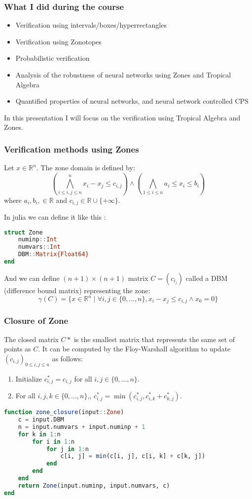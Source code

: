 \documentclass{beamer}
\begin{document}
\begin{frame}
    \frametitle{What I did during the course}
    \begin{itemize}
        \item Verification using intervals/boxes/hyperrectangles
        \item Verification using Zonotopes
        \item Probabilistic verification
        \item Analysis of the robustness of neural networks using Zones and Tropical Algebra
        \item  Quantified properties of neural networks,
        and neural network controlled CPS
    \end{itemize}

In this presentation I will focus on the verification using Tropical Algebra and Zones.
\end{frame}
\begin{frame}[fragile]
\frametitle{Verification methods using Zones}

        Let \(x \in \mathbb{R}^n \). The zone domain is defined by:
        \[(\bigwedge_{i\leq i,j\leq n}^n x_i - x_j \leq c_{i,j}) \land (\bigwedge_{1\leq i\leq n} a_i \leq x_i \leq b_i)\]
        where \(a_i, b_i,  \in \mathbb{R} \) and \(c_{i,j} \in \mathbb{R} \cup \{+\infty\} \).

    In julia we can define it like this : 
\begin{lstlisting}[language= Julia]
struct Zone
    numinp::Int 
    numvars::Int
    DBM::Matrix{Float64}
end
\end{lstlisting}
And we can define \((n+1) \times (n+1) \) matrix \(C = (c_{i_j})\) called a DBM (difference bound matrix) representing the zone:
\[ \gamma(C) = \{x \in \mathbb{R}^n \mid \forall i,j \in \{0, \ldots, n\}, x_i - x_j \leq c_{i,j} \land x_0 = 0 \} \]
\end{frame}

\begin{frame}[fragile]
\frametitle{Closure of Zone}

The closed matrix \(C* \) is the smallest matrix that represents the same set of points as \(C \). It can be computed by the Floy-Warshall algorithm to update \((c_{i,j})_{0\leq i,j\leq n} \) as follows:
\begin{enumerate}
    \item Initialize \(c^*_{i,j} = c_{i,j} \) for all \(i,j \in \{0, \ldots, n\} \).
    \item For all \(i,j,k \in \{0, \ldots, n\} \),, \(c^*_{i,j} = \min(c^*_{i,j}, c^*_{i,k} + c^*_{k,j}) \).
\end{enumerate}

\begin{lstlisting}[language= Julia]
function zone_closure(input::Zone)
    c = input.DBM
    n = input.numvars + input.numinp + 1
    for k in 1:n
        for i in 1:n
            for j in 1:n
                c[i, j] = min(c[i, j], c[i, k] + c[k, j])
            end
        end
    end
    return Zone(input.numinp, input.numvars, c)
end
\end{lstlisting}
\end{frame}
\end{document}
